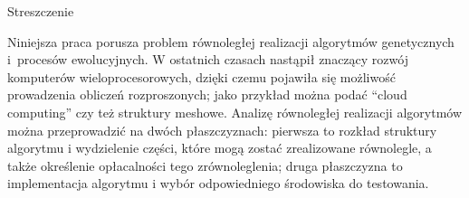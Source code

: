 \begin{center}
	Streszczenie
\end{center}

Niniejsza praca porusza problem równoległej realizacji algorytmów genetycznych
i~procesów ewolucyjnych. W ostatnich czasach nastąpił znaczący rozwój komputerów
wieloprocesorowych, dzięki czemu pojawiła się możliwość prowadzenia obliczeń
rozproszonych; jako przykład można podać ``cloud computing'' czy też struktury
meshowe. Analizę równoległej realizacji algorytmów można przeprowadzić na dwóch
płaszczyznach: pierwsza to rozkład struktury algorytmu i wydzielenie części, które
mogą zostać zrealizowane równolegle, a także określenie opłacalności tego
zrównoleglenia; druga płaszczyzna to implementacja algorytmu i wybór
odpowiedniego środowiska do testowania. 


